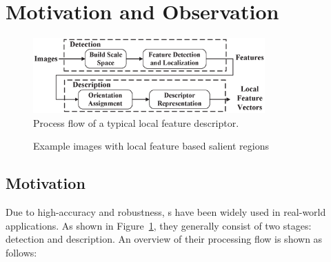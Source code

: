 \section{Motivation and Observation}
\label{sec:observation}

\begin{figure}
	\centering
	\includegraphics[width=3.5in]{images/fig-workflow.eps}
	\caption{Process flow of a typical local feature descriptor.}
	\label{fig:workflow}
\end{figure}

\begin{figure}[!t]
	\centering
	\hfil
	\caption{Example images with local feature based salient regions}
	\label{fig:observations}
\end{figure}

\subsection{Motivation}

Due to high-accuracy and robustness, {\lfea}s have been widely used in real-world applications. As shown in Figure~\ref{fig:workflow}, they generally consist of two stages: detection and description.  An overview of their processing flow is shown as follows:

